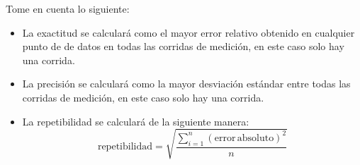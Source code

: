 \documentclass[12pt]{article}
\begin{document}
Tome en cuenta lo siguiente:
\begin{itemize}
    \item La exactitud se calculará como el mayor error relativo obtenido en cualquier punto de de datos en todas las corridas de medición, en este caso solo hay una corrida.
    \item La precisión se calculará como la mayor desviación estándar entre todas las corridas de medición, en este caso solo hay una corrida.
    \item La repetibilidad se calculará de la siguiente manera:
    \begin{equation*}
        \mathrm{repetibilidad} = \sqrt{\dfrac{\sum_{i=1}^n(\mathrm{error\,absoluto})^2}{n}}
    \end{equation*}
\end{itemize}
\end{document}
